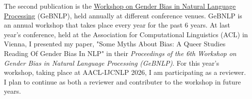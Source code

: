 \documentclass[12pt]{article}
\begin{document}
The second publication is the \uline{\href{https://gebnlp-workshop.github.io/}{Workshop on Gender Bias in Natural
Language Processing}} (GeBNLP), held annually at different conference
venues. GeBNLP is an annual workshop that takes place every year for
the past 6 years. At last year's conference, held at the Association
for Computational Linguistics (ACL) in Vienna, I presented my paper,
"Some Myths About Bias: A Queer Studies Reading Of Gender Bias In NLP"
in their \emph{Proceedings of the 6th Workshop on Gender Bias in Natural
Language Processing (GeBNLP)}. For this year's workshop, taking place
at AACL-IJCNLP 2026, I am participating as a reviewer. I plan to
continue as both a reviewer and contributer to the workshop in future
years.
\end{document}
